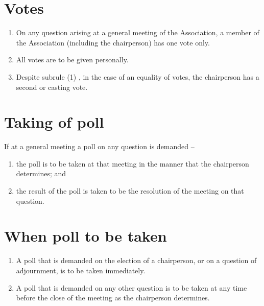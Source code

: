 \documentclass[a4paper,11pt]{article}
\begin{document}
\section{Votes}
\begin{enumerate}
	\item On any question arising at a general meeting of the Association, a member of the Association (including the chairperson) has one vote only.
	\item All votes are to be given personally.
	\item Despite subrule (1) , in the case of an equality of votes, the chairperson has a second or casting vote.
\end{enumerate}

\section{Taking of poll}
If at a general meeting a poll on any question is demanded --
\begin{enumerate}
	\item the poll is to be taken at that meeting in the manner that the chairperson determines; and
	\item the result of the poll is taken to be the resolution of the meeting on that question.
\end{enumerate}

\section{When poll to be taken}
\begin{enumerate}
	\item A poll that is demanded on the election of a chairperson, or on a question of adjournment, is to be taken immediately.
	\item A poll that is demanded on any other question is to be taken at any time before the close of the meeting as the chairperson determines.
\end{enumerate}
\end{document}
